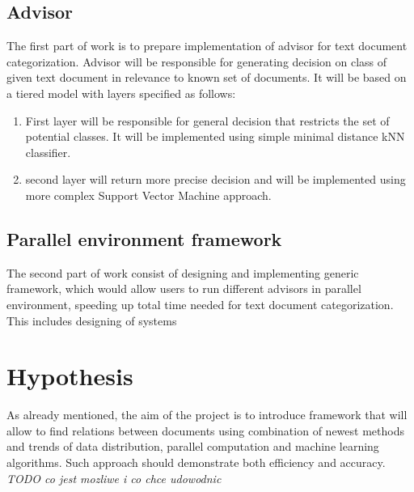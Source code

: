 \subsection{Advisor}
The first part of work is to prepare implementation of advisor for text document categorization. Advisor will be responsible for generating decision on class of given text document in relevance to known set of documents. It will be based on a tiered model with layers specified as follows:
\begin{enumerate}
\item First layer will be responsible for general decision that restricts the set of potential classes. It will be implemented using simple minimal distance kNN classifier.
\item second layer will return more precise decision and will be implemented using more complex Support Vector Machine approach.
\end{enumerate}
	
\subsection{Parallel environment framework}
The second part of work consist of designing and implementing generic framework, which would allow users to run different advisors in parallel environment, speeding up total time needed for text document categorization. This includes designing of systems 

\section{Hypothesis}
\label{hypo}
As already mentioned, the aim of the project is to introduce framework that will allow to find relations between documents using combination of newest methods and trends of data distribution, parallel computation and machine learning algorithms. Such approach should demonstrate both efficiency and accuracy.
\textit{TODO co jest mozliwe i co chce udowodnic}

